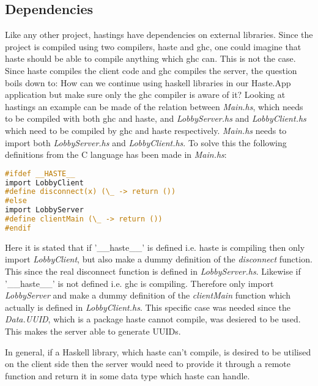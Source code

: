 \documentclass[a4paper]{article}
\begin{document}
\subsection{Dependencies} 
\label{sub:dependencies}
Like any other project, hastings have dependencies on external libraries. Since the project is compiled using two compilers, haste and ghc, one could imagine that haste should be able to compile anything which ghc can. This is not the case. Since haste compiles the client code and ghc compiles the server, the question boils down to: How can we continue using haskell libraries in our Haste.App application but make sure only the ghc compiler is aware of it? Looking at hastings an example can be made of the relation between \textit{Main.hs}, which needs to be compiled with both ghc and haste, and \textit{LobbyServer.hs} and \textit{LobbyClient.hs} which need to be compiled by ghc and haste respectively. 
\textit{Main.hs} needs to import both \textit{LobbyServer.hs} and \textit{LobbyClient.hs}. To solve this the following definitions from the C language has been made in \textit{Main.hs}:
\begin{lstlisting}[language=C]
#ifdef __HASTE__
import LobbyClient
#define disconnect(x) (\_ -> return ())
#else
import LobbyServer
#define clientMain (\_ -> return ())
#endif
\end{lstlisting}
Here it is stated that if '\_\_haste\_\_' is defined i.e. haste is compiling then only import \textit{LobbyClient}, but also make a dummy definition of the \textit{disconnect} function. This since the real disconnect function is defined in \textit{LobbyServer.hs}. Likewise if '\_\_haste\_\_' is not defined i.e. ghc is compiling. Therefore only import \textit{LobbyServer} and make a dummy definition of the \textit{clientMain} function which actually is defined in \textit{LobbyClient.hs}. This specific case was needed since the \textit{Data.UUID}, which is a package haste cannot compile, was desiered to be used. This makes the server able to generate UUIDs.

In general, if a Haskell library, which haste can't compile, is desired to be utilised on the client side then the server would need to provide it through a remote function and return it in some data type which haste can handle.
\end{document}
